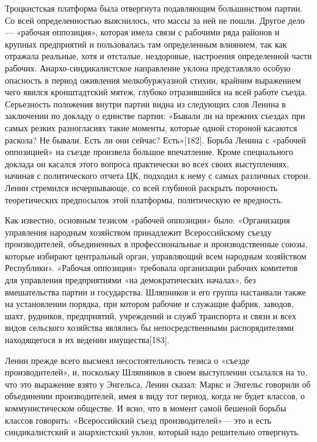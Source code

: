 \documentclass[12pt, a4paper, openany]{book}
\begin{document}
Троцкистская платформа была отвергнута подавляющим большинством партии. Со всей определенностью выяснилось, что массы за ней не пошли. Другое дело — «рабочая оппозиция», которая имела связи с рабочими ряда районов и крупных предприятий и пользовалась там определенным влиянием, так как отражала реальные, хотя и отсталые, нездоровые, настроения определенной части рабочих. Анархо-синдикалистское направление уклона представляло особую опасность в период оживления мелкобуржуазной стихии, крайним выражением чего явился кронштадтский мятеж, глубоко отразившийся на всей работе съезда. Серьезность положения внутри партии видна из следующих слов Ленина в заключении по докладу о единстве партии: «Бывали ли на прежних съездах при самых резких разногласиях такие моменты, которые одной стороной касаются раскола? Не бывали. Есть ли они сейчас? Есть»[182]. Борьба Ленина с «рабочей оппозицией» на съезде произвела большое впечатление. Кроме специального доклада он касался этого вопроса практически во всех своих выступлениях, начиная с политического отчета ЦК, подходил к нему с самых различных сторон. Ленин стремился исчерпывающе, со всей глубиной раскрыть порочность теоретических предпосылок этой платформы, политическую ее вредность.

Как известно, основным тезисом «рабочей оппозиции» было: «Организация управления народным хозяйством принадлежит Всероссийскому съезду производителей, объединенных в профессиональные и производственные союзы, которые избирают центральный орган, управляющий всем народным хозяйством Республики». «Рабочая оппозиция» требовала организации рабочих комитетов для управления предприятиями «на демократических началах», без вмешательства партии и государства. Шляпников и его группа настаивали также на установлении порядка, при котором рабочие и служащие фабрик, заводов, шахт, рудников, предприятий, учреждений и служб транспорта и связи и всех видов сельского хозяйства являлись бы непосредственными распорядителями находящегося в их ведении имущества[183].

Ленин прежде всего высмеял несостоятельность тезиса о «съезде производителей», и, поскольку Шляпников в своем выступлении ссылался на то, что это выражение взято у Энгельса, Ленин сказал: Маркс и Энгельс говорили об объединении производителей, имея в виду тот период, когда не будет классов, о коммунистическом обществе. И ясно, что в момент самой бешеной борьбы классов говорить: «Всероссийский съезд производителей»— это и есть синдикалистский и анархистский уклон, который надо решительно отвергнуть.
\end{document}
